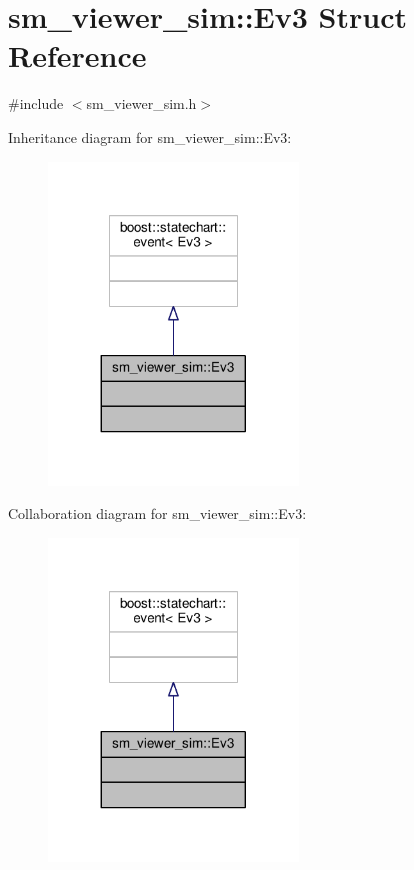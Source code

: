 \hypertarget{structsm__viewer__sim_1_1Ev3}{}\section{sm\+\_\+viewer\+\_\+sim\+:\+:Ev3 Struct Reference}
\label{structsm__viewer__sim_1_1Ev3}


{\ttfamily \#include $<$sm\+\_\+viewer\+\_\+sim.\+h$>$}



Inheritance diagram for sm\+\_\+viewer\+\_\+sim\+:\+:Ev3\+:
\nopagebreak
\begin{figure}[H]
\begin{center}
\leavevmode
\includegraphics[width=188pt]{structsm__viewer__sim_1_1Ev3__inherit__graph}
\end{center}
\end{figure}


Collaboration diagram for sm\+\_\+viewer\+\_\+sim\+:\+:Ev3\+:
\nopagebreak
\begin{figure}[H]
\begin{center}
\leavevmode
\includegraphics[width=188pt]{structsm__viewer__sim_1_1Ev3__coll__graph}
\end{center}
\end{figure}


